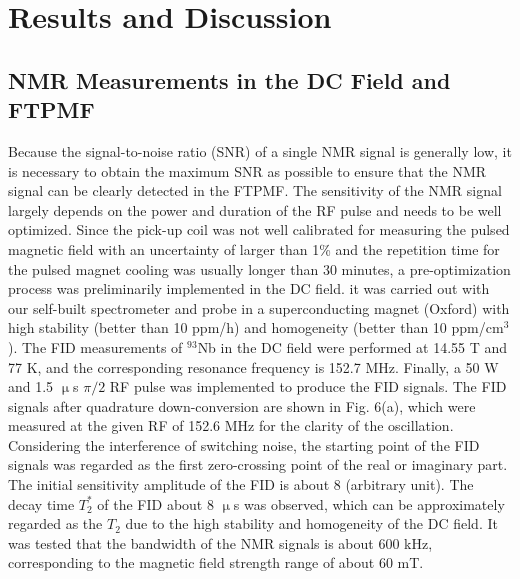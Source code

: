 \documentclass[lettersize,journal]{IEEEtran}
\begin{document}
\section{Results and Discussion}
\subsection{NMR Measurements in the DC Field and FTPMF}
 Because the signal-to-noise ratio (SNR) of a single NMR signal is generally low, it is necessary to obtain the maximum SNR as possible to ensure that the NMR signal can be clearly detected in the FTPMF. The sensitivity of the NMR signal largely depends on the power and duration of the RF pulse and needs to be well optimized\cite{ref10}. Since the pick-up coil was not well calibrated for measuring the pulsed magnetic field with an uncertainty of larger than 1{\%} and the repetition time for the pulsed magnet cooling was usually longer than 30 minutes, a pre-optimization process was preliminarily implemented in the DC field. it was carried out with our self-built spectrometer and probe in a superconducting magnet (Oxford) with high stability (better than 10 ppm/h) and homogeneity (better than 10 ppm/cm$^3$). The FID measurements of $^{93}$Nb in the DC field were performed at 14.55 T and 77 K, and the corresponding resonance frequency is 152.7 MHz. Finally, a 50 W and 1.5 $\upmu$s $\pi/2$ RF pulse was implemented to produce the FID signals. The FID signals after quadrature down-conversion are shown in Fig. 6(a), which were measured at the given RF of 152.6 MHz for the clarity of the oscillation. Considering the interference of switching noise, the starting point of the FID signals was regarded as the first zero-crossing point of the real or imaginary part. The initial sensitivity amplitude of the FID is about 8 (arbitrary unit). The decay time $T_{2}^{*}$ of the FID about 8 $\upmu$s was observed, which can be approximately regarded as the $T_2$ due to the high stability and homogeneity of the DC field. It was tested that the bandwidth of the NMR signals is about 600 kHz, corresponding to the magnetic field strength range of about 60 mT.
 
\end{document}
